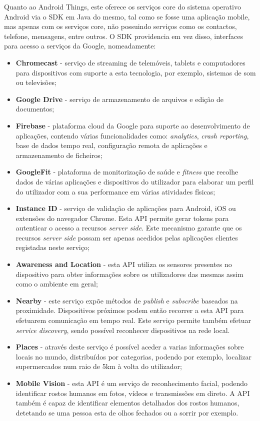 Quanto ao Android Things, este oferece os serviços core do sistema operativo Android via o SDK em Java do mesmo, tal como se fosse uma aplicação mobile, mas apenas com os serviços core, não possuindo serviços como os contactos, telefone, mensagens, entre outros. O SDK providencia em vez disso, interfaces para acesso a serviços da Google, nomeadamente:

\begin{itemize}
\item \textbf{Chromecast} - serviço de streaming de telemóveis, tablets e computadores para dispositivos com suporte a esta tecnologia, por exemplo, sistemas de som ou televisões;
\item \textbf{Google Drive} - serviço de armazenamento de arquivos e edição de documentos;
\item \textbf{Firebase} - plataforma cloud da Google para suporte ao desenvolvimento de aplicações, contendo várias funcionalidades como: \textit{analytics}, \textit{crash reporting}, base de dados tempo real, configuração remota de aplicações e armazenamento de ficheiros;
\item \textbf{GoogleFit} - plataforma de monitorização de saúde e \textit{fitness} que recolhe dados de várias aplicações e dispositivos do utilizador para elaborar um perfil do utilizador com a sua performance em várias atividades físicas;
\item \textbf{Instance ID} - serviço de validação de aplicações para Android, iOS ou extensões do navegador Chrome. Esta API permite gerar tokens para autenticar o acesso a recursos \textit{server side}. Este mecanismo garante que os recursos \textit{server side} possam ser apenas acedidos pelas aplicações clientes registadas neste serviço;
\item \textbf{Awareness and Location} - esta API utiliza os sensores presentes no dispositivo para obter informações sobre os utilizadores das mesmas assim como o ambiente em geral;
\item \textbf{Nearby} - este serviço expõe métodos de \textit{publish} e \textit{subscribe} baseados na proximidade. Dispositivos próximos podem então recorrer a esta API para efetuarem comunicação em tempo real. Este serviço permite também efetuar \textit{service discovery}, sendo possível reconhecer dispositivos na rede local.
\item \textbf{Places} - através deste serviço é possível aceder a varias informações sobre locais no mundo, distribuídos por categorias, podendo por exemplo, localizar supermercados num raio de 5km à volta do utilizador;
\item \textbf{Mobile Vision} - esta API é um serviço de reconhecimento facial, podendo identificar rostos humanos em fotos, vídeos e transmissões em direto. A API também é capaz de identificar elementos detalhados dos rostos humanos, detetando se uma pessoa esta de olhos fechados ou a sorrir por exemplo.
\end{itemize}

